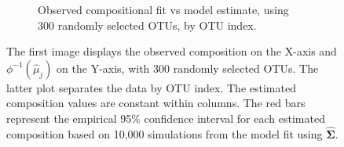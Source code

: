 \documentclass{template}
\begin{document}
\begin{figure}[ht!]
\begin{subfigure}[b]{0.38\textheight}
        \caption{Observed compositional fit vs model estimate, using 300 randomly selected OTUs, by OTU index.}
    \end{subfigure}
    \caption{The first image displays the observed composition on the X-axis and $\phi^{-1}(\hat{\mu}_j)$ on the Y-axis, with 300 randomly selected OTUs. The latter plot separates the data by OTU index. The estimated composition values are constant within columns. The red bars represent the empirical 95\% confidence interval for each estimated composition based on 10,000 simulations from the model fit using $\hat{\boldsymbol{\Sigma}}$.}\label{fig:compFitBar300}
\end{figure}

\FloatBarrier
\clearpage 



\end{document}
